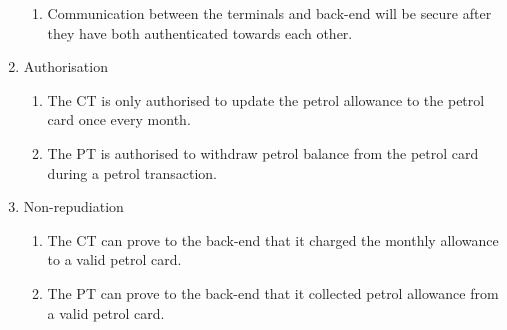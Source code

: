 \begin{enumerate}
\begin{enumerate}
		\item Communication between the terminals and back-end will be secure after they have both authenticated towards each other.
		\end{enumerate}	
		


\item Authorisation
	\begin{enumerate}
	\item The CT is only authorised to update the petrol allowance to the petrol card once every month.
	\item The PT is authorised to withdraw petrol balance from the petrol card during a petrol transaction.
	\end{enumerate}


\item Non-repudiation
	\begin{enumerate}
		\item The CT can prove to the back-end that it charged the monthly allowance to a valid petrol card. 
		\item The PT can prove to the back-end that it collected petrol allowance from a valid petrol card.
	\end{enumerate}

\end{enumerate}
